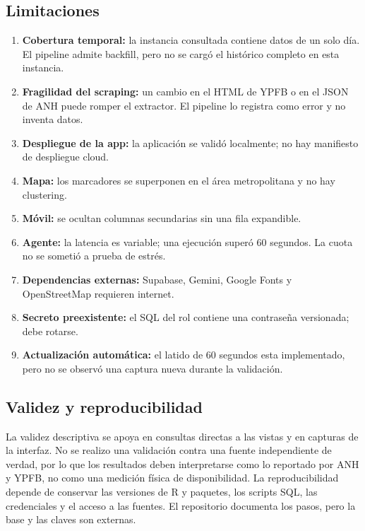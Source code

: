 \documentclass[12pt,a4paper]{article}
\begin{document}
\subsection{Limitaciones}

\begin{enumerate}[leftmargin=1.2cm]
  \item \textbf{Cobertura temporal:} la instancia consultada contiene datos de un solo día. El pipeline admite backfill, pero no se cargó el histórico completo en esta instancia.
  \item \textbf{Fragilidad del scraping:} un cambio en el HTML de YPFB o en el JSON de ANH puede romper el extractor. El pipeline lo registra como error y no inventa datos.
  \item \textbf{Despliegue de la app:} la aplicación se validó localmente; no hay manifiesto de despliegue cloud.
  \item \textbf{Mapa:} los marcadores se superponen en el área metropolitana y no hay clustering.
  \item \textbf{Móvil:} se ocultan columnas secundarias sin una fila expandible.
  \item \textbf{Agente:} la latencia es variable; una ejecución superó 60 segundos. La cuota no se sometió a prueba de estrés.
  \item \textbf{Dependencias externas:} Supabase, Gemini, Google Fonts y OpenStreetMap requieren internet.
  \item \textbf{Secreto preexistente:} el SQL del rol contiene una contraseña versionada; debe rotarse.
  \item \textbf{Actualización automática:} el latido de 60 segundos esta implementado, pero no se observó una captura nueva durante la validación.
\end{enumerate}

\subsection{Validez y reproducibilidad}

La validez descriptiva se apoya en consultas directas a las vistas y en capturas de la interfaz. No se realizo una validación contra una fuente independiente de verdad, por lo que los resultados deben interpretarse como lo reportado por ANH y YPFB, no como una medición física de disponibilidad. La reproducibilidad depende de conservar las versiones de R y paquetes, los scripts SQL, las credenciales y el acceso a las fuentes. El repositorio documenta los pasos, pero la base y las claves son externas.
\end{document}
